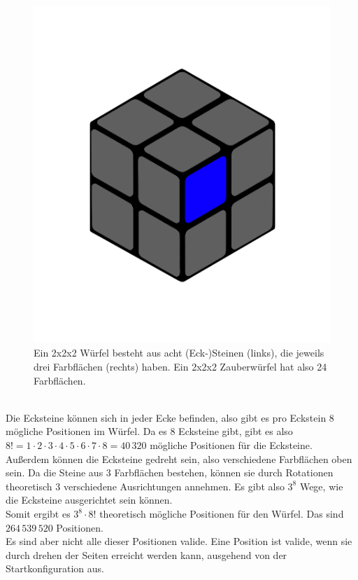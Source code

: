 \documentclass[12pt,a4paper, usenames, dvipsnames]{scrartcl}
\begin{document}
\begin{figure}[h]
\includegraphics[scale=0.1]{2x2farbflaeche.png}
\caption{Ein 2x2x2 Würfel besteht aus acht (Eck-)Steinen (links), die jeweils drei Farbflächen (rechts) haben. Ein 2x2x2 Zauberwürfel hat also 24 Farbflächen.}
\end{figure} 
$\ $ \\
Die Ecksteine können sich in jeder Ecke befinden, also gibt es pro Eckstein 8 mögliche Positionen im Würfel. Da es 8 Ecksteine gibt, gibt es also $8! = 1 \cdot 2 \cdot 3 \cdot 4 \cdot 5 \cdot 6 \cdot 7 \cdot 8 = 40\, 320$ mögliche Positionen für die Ecksteine. \\
Außerdem können die Ecksteine gedreht sein, also verschiedene Farbflächen oben sein. Da die Steine aus 3 Farbflächen bestehen, können sie durch Rotationen theoretisch 3 verschiedene Ausrichtungen annehmen. Es gibt also $3^8$ Wege, wie die Ecksteine ausgerichtet sein können. \\
Somit ergibt es $3^8 \cdot 8!$ theoretisch mögliche Positionen für den Würfel. Das sind $264\, 539\, 520$ Positionen.\\
Es sind aber nicht alle dieser Positionen valide. Eine Position ist valide, wenn sie durch drehen der Seiten erreicht werden kann, ausgehend von der Startkonfiguration aus. \\
\end{document}
